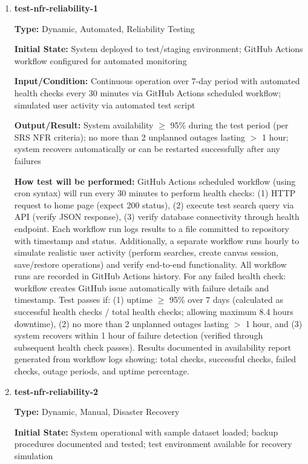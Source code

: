 \documentclass[12pt, titlepage]{article}
\begin{document}
\begin{enumerate}

\item \textbf{test-nfr-reliability-1}

\textbf{Type:} Dynamic, Automated, Reliability Testing

\textbf{Initial State:} System deployed to test/staging environment; GitHub Actions workflow configured for automated monitoring

\textbf{Input/Condition:} Continuous operation over 7-day period with automated health checks every 30 minutes via GitHub Actions scheduled workflow; simulated user activity via automated test script

\textbf{Output/Result:} System availability $\geq$ 95\% during the test period (per SRS NFR criteria); no more than 2 unplanned outages lasting $>$ 1 hour; system recovers automatically or can be restarted successfully after any failures

\textbf{How test will be performed:} GitHub Actions scheduled workflow (using cron syntax) will run every 30 minutes to perform health checks: (1) HTTP request to home page (expect 200 status), (2) execute test search query via API (verify JSON response), (3) verify database connectivity through health endpoint. Each workflow run logs results to a file committed to repository with timestamp and status. Additionally, a separate workflow runs hourly to simulate realistic user activity (perform searches, create canvas session, save/restore operations) and verify end-to-end functionality. All workflow runs are recorded in GitHub Actions history. For any failed health check: workflow creates GitHub issue automatically with failure details and timestamp. Test passes if: (1) uptime $\geq$ 95\% over 7 days (calculated as successful health checks / total health checks; allowing maximum 8.4 hours downtime), (2) no more than 2 unplanned outages lasting $>$ 1 hour, and (3) system recovers within 1 hour of failure detection (verified through subsequent health check passes). Results documented in availability report generated from workflow logs showing: total checks, successful checks, failed checks, outage periods, and uptime percentage.

\item \textbf{test-nfr-reliability-2}

\textbf{Type:} Dynamic, Manual, Disaster Recovery

\textbf{Initial State:} System operational with sample dataset loaded; backup procedures documented and tested; test environment available for recovery simulation


\end{enumerate}
\end{document}
